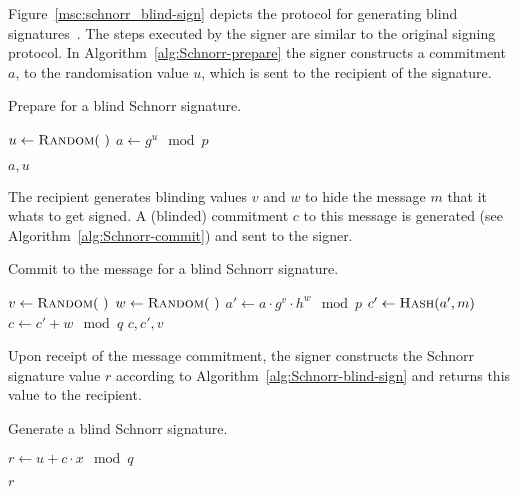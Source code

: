 Figure~\ref{msc:schnorr_blind-sign} depicts the protocol for generating blind
signatures~\cite{PointchevalStern1996}. The steps executed by the signer are
similar to the original signing protocol. In Algorithm~\ref{alg:Schnorr-prepare}
the signer constructs a commitment $a$, to the randomisation value $u$, which is
sent to the recipient of the signature.

\begin{algorithm}
  \caption{Prepare for a blind Schnorr signature.}
  \label{alg:Schnorr-prepare}
  \addtolength{\baselineskip}{1mm}
  \begin{algorithmic}[1]
      \State $u \gets \Call{Random}{~}$
      \State $a \gets g^u \mod p$

      \Return $a, u$
    \EndFunction
  \end{algorithmic}
\end{algorithm}

The recipient generates blinding values $v$ and $w$ to hide the message $m$ that
it whats to get signed. A (blinded) commitment $c$ to this message is generated
(see Algorithm~\ref{alg:Schnorr-commit}) and sent to the signer.

\begin{algorithm}
  \caption{Commit to the message for a blind Schnorr signature.}
  \label{alg:Schnorr-commit}
  \addtolength{\baselineskip}{1mm}
  \begin{algorithmic}[1]
      \State $v \gets \Call{Random}{~}$
      \State $w \gets \Call{Random}{~}$
      \State $a' \gets a \cdot g^v \cdot h^w \mod p$
      \State $c' \gets \Call{Hash}{a', m}$
      \State $c \gets c' + w \mod q$
      \Return $c, c', v$
    \EndFunction
  \end{algorithmic}
\end{algorithm}

Upon receipt of the message commitment, the signer constructs the Schnorr
signature value $r$ according to Algorithm~\ref{alg:Schnorr-blind-sign} and
returns this value to the recipient.

\begin{algorithm}[H]
  \caption{Generate a blind Schnorr signature.}
  \label{alg:Schnorr-blind-sign}
  \addtolength{\baselineskip}{1mm}
  \begin{algorithmic}[1]
      \State $r \gets u + c \cdot x \mod q$

      \Return $r$
    \EndFunction
  \end{algorithmic}
\end{algorithm}

